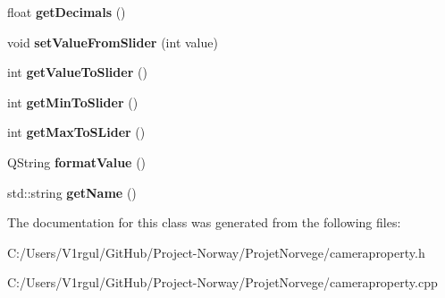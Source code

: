 \begin{DoxyCompactItemize}
\item 
\hypertarget{class_camera_manager_1_1_camera_property_a58c15ba2b37a26641154740ebb2190f7}{float {\bfseries get\-Decimals} ()}\label{class_camera_manager_1_1_camera_property_a58c15ba2b37a26641154740ebb2190f7}

\item 
\hypertarget{class_camera_manager_1_1_camera_property_aebccd803702e01dbd9418b0ed4efba9a}{void {\bfseries set\-Value\-From\-Slider} (int value)}\label{class_camera_manager_1_1_camera_property_aebccd803702e01dbd9418b0ed4efba9a}

\item 
\hypertarget{class_camera_manager_1_1_camera_property_aa07b5e54635ea946dde8e5e3407c38d8}{int {\bfseries get\-Value\-To\-Slider} ()}\label{class_camera_manager_1_1_camera_property_aa07b5e54635ea946dde8e5e3407c38d8}

\item 
\hypertarget{class_camera_manager_1_1_camera_property_a8680d2fcb0b57d832d7c13065320439f}{int {\bfseries get\-Min\-To\-Slider} ()}\label{class_camera_manager_1_1_camera_property_a8680d2fcb0b57d832d7c13065320439f}

\item 
\hypertarget{class_camera_manager_1_1_camera_property_a756d1e67c3e8f994e836c6b2b3334f13}{int {\bfseries get\-Max\-To\-S\-Lider} ()}\label{class_camera_manager_1_1_camera_property_a756d1e67c3e8f994e836c6b2b3334f13}

\item 
\hypertarget{class_camera_manager_1_1_camera_property_ab3f85bdadf9078d3af6c1cf42f8fb1f1}{Q\-String {\bfseries format\-Value} ()}\label{class_camera_manager_1_1_camera_property_ab3f85bdadf9078d3af6c1cf42f8fb1f1}

\item 
\hypertarget{class_camera_manager_1_1_camera_property_a6cf265bfe49e74d23d946e4d8a6b8f98}{std\-::string {\bfseries get\-Name} ()}\label{class_camera_manager_1_1_camera_property_a6cf265bfe49e74d23d946e4d8a6b8f98}

\end{DoxyCompactItemize}


The documentation for this class was generated from the following files\-:\begin{DoxyCompactItemize}
\item 
C\-:/\-Users/\-V1rgul/\-Git\-Hub/\-Project-\/\-Norway/\-Projet\-Norvege/cameraproperty.\-h\item 
C\-:/\-Users/\-V1rgul/\-Git\-Hub/\-Project-\/\-Norway/\-Projet\-Norvege/cameraproperty.\-cpp\end{DoxyCompactItemize}
